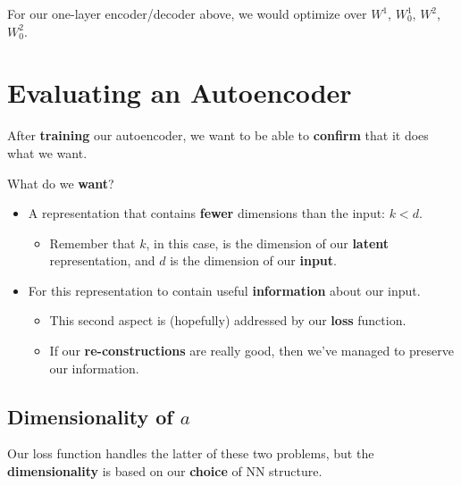         \miniex For our one-layer encoder/decoder above, we would optimize over $W^1$, $W^1_0$, $W^2$, $W^2_0$.

    
\pagebreak
\section{Evaluating an Autoencoder}

    After \textbf{training} our autoencoder, we want to be able to \textbf{confirm} that it does what we want.

    What do we \textbf{want}?

    \begin{itemize}
        \item A representation that contains \textbf{fewer} dimensions than the input: $k < d$.

            \begin{itemize}
                \item Remember that $k$, in this case, is the dimension of our \textbf{latent} representation, and $d$ is the dimension of our \textbf{input}.
            \end{itemize}

        \item For this representation to contain useful \textbf{information} about our input.
            \begin{itemize}
                \item This second aspect is (hopefully) addressed by our \textbf{loss} function. 
                \item If our \textbf{re-constructions} are really good, then we've managed to preserve our information.
            \end{itemize}
    \end{itemize}

    \subsection{Dimensionality of $a$}

        Our loss function handles the latter of these two problems, but the \textbf{dimensionality} is based on our \textbf{choice} of NN structure.

